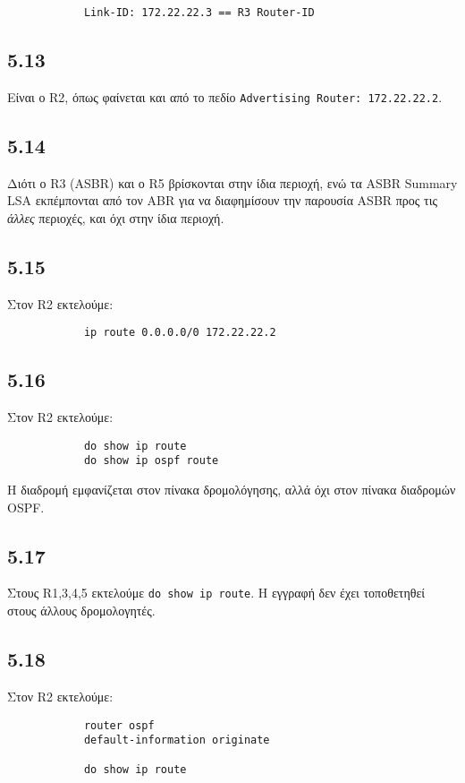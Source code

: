 \documentclass[a4paper, 12pt]{article}
\begin{document}
		\begin{verbatim}
			Link-ID: 172.22.22.3 == R3 Router-ID
		\end{verbatim}

	\subsection*{5.13}
		Είναι ο R2, όπως φαίνεται και από το πεδίο \verb|Advertising Router: 172.22.22.2|.

	\subsection*{5.14}
		Διότι ο R3 (ASBR) και ο R5 βρίσκονται στην ίδια περιοχή, ενώ τα ASBR Summary LSA εκπέμπονται από τον ABR για να διαφημίσουν την παρουσία ASBR προς τις \emph{άλλες} περιοχές, και όχι στην ίδια περιοχή.

	\subsection*{5.15}
		Στον R2 εκτελούμε:
		
		\begin{verbatim}
			ip route 0.0.0.0/0 172.22.22.2
		\end{verbatim}

	\subsection*{5.16}
		Στον R2 εκτελούμε:
		
		\begin{verbatim}
			do show ip route
			do show ip ospf route
		\end{verbatim}
		
		Η διαδρομή εμφανίζεται στον πίνακα δρομολόγησης, αλλά όχι στον πίνακα διαδρομών OSPF.

	\subsection*{5.17}
		Στους R1,3,4,5 εκτελούμε \verb|do show ip route|. Η εγγραφή δεν έχει τοποθετηθεί στους άλλους δρομολογητές.

	\subsection*{5.18}
		Στον R2 εκτελούμε:
		
		\begin{verbatim}
			router ospf
			default-information originate
			
			do show ip route
		\end{verbatim}
		
\end{document}

